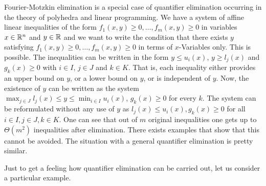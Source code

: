 \begin{remark}
	Fourier-Motzkin elimination is a special case of quantifier elimination occurring in the theory of polyhedra and linear programming. We have a system of affine linear inequalities of the form $f_1(x,y) \ge 0,\ldots,f_m(x,y) \ge 0$ in variables $x \in \mathbb{R}^n$ and $y \in \mathbb{R}$ and we want to write the condition that there exists $y$ satisfying $f_1(x,y) \ge 0,\ldots, f_m(x,y) \ge 0$ in terms of $x$-Variables only. This is possible. The inequalities can be written in the form $y \le u_i(x)$, $y \ge l_j(x)$ and $g_k(x) \ge 0$ with $i \in I$, $j \in J$ and $k \in K$. That is, each inequality either provides an upper bound on $y$, or a lower bound on $y$, or is independent of $y$. Now, the existence of $y$ can be written as the system $\max_{j \in J} l_j(x) \le y \le \min_{i \in I} u_i(x)$, $g_k(x) \ge 0$ for every $k$. The system can be reformulated without any use of $y$ as $l_j(x) \le u_i(x), g_k(x) \ge 0$ for all $i \in I, j \in J, k \in K$. One can see that out of $m$ original inequalities one gets up to $\Theta(m^2)$ inequalities after elimination. There exists examples that show that this cannot be avoided. The situation with a general quantifier elimination is pretty similar. 
\end{remark}

Just to get a feeling how quantifier elimination can be carried out, let us consider a particular example. 

